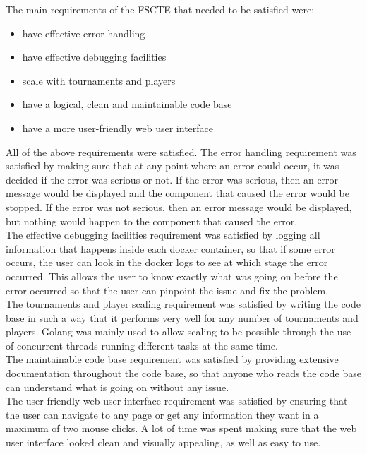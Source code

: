 \documentclass[a4paper, 12pt]{report}
\begin{document}
The main requirements of the FSCTE that needed to be satisfied were:
\begin{itemize}
	\item have effective error handling
	\item have effective debugging facilities
	\item scale with tournaments and players
	\item have a logical, clean and maintainable code base
	\item have a more user-friendly web user interface
\end{itemize}
All of the above requirements were satisfied. The error handling requirement
was satisfied by making sure that at any point where an error could occur, it
was decided if the error was serious or not. If the error was serious, then an
error message would be displayed and the component that caused the error would
be stopped. If the error was not serious, then an error message would be displayed,
but nothing would happen to the component that caused the error. \\

The effective debugging facilities requirement was satisfied by logging all
information that happens inside each docker container, so that if some error
occurs, the user can look in the docker logs to see at which stage the error
occurred. This allows the user to know exactly what was going on before the
error occurred so that the user can pinpoint the issue and fix the problem. \\

The tournaments and player scaling requirement was satisfied by writing the
code base in such a way that it performs very well for any number of tournaments
and players. Golang was mainly used to allow scaling to be possible through the
use of concurrent threads running different tasks at the same time. \\

The maintainable code base requirement was satisfied by providing extensive
documentation throughout the code base, so that anyone who reads the code base
can understand what is going on without any issue. \\

The user-friendly web user interface requirement was satisfied by ensuring that
the user can navigate to any page or get any information they want in a maximum
of two mouse clicks. A lot of time was spent making sure that the web user
interface looked clean and visually appealing, as well as easy to use. \\
\end{document}
